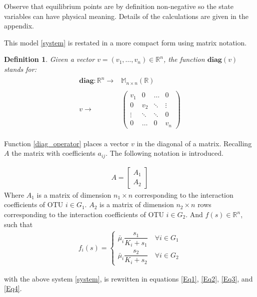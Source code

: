 \documentclass[3p,times]{elsarticle}
\newcommand{\R}{\mathbb{R}}
\newcommand{\diag}{\textbf{diag}}
\newtheorem{defn}{Definition}
\begin{document}
Observe that equilibrium points are by definition non-negative so the state variables can have physical meaning. Details of the calculations are given in the appendix. 

This model \eqref{system} is restated in a more compact form using matrix notation.

\begin{defn} Given a vector $v=(v_1,\dots, v_n)\in \R^n$, the function $\diag(v)$ stands for:
	\begin{align}
	\begin{array}{rc}
	\diag:\R^n \rightarrow & \mathbb{M}_{n\times n}(\R)\\
	& \\
	v \rightarrow & \begin{pmatrix}
	v_1 & 0 & \dots & 0 \\
	0 & v_2 & \ddots & \vdots\\ 
	\vdots & \ddots & \ddots& 0 \\
	0 & \dots &0 & v_n 
	\end{pmatrix}
	\end{array} \label{diag_operator}
	\end{align}
\end{defn}

Function \eqref{diag_operator} places a vector $v$ in the diagonal of a matrix. Recalling $A$ the matrix with coefficients $a_{ij}$. The following notation is introduced.

\begin{align} A = \begin{bmatrix}
A_1\\A_2
\end{bmatrix}\end{align}
 Where $A_1$ is a matrix of dimension $n_1 \times n$ corresponding to the interaction coefficients of OTU $i \in G_1$. $A_2$ is a matrix of dimension $n_2 \times n$ rows corresponding to the interaction coefficients of OTU $i \in G_2$.
And  $f(s) \in \R^n$, such that 
\begin{align}
f_i(s) = \begin{cases}
\bar{\mu}_i \dfrac{s_1}{K_i + s_1} \quad \forall i \in G_1 \\
\bar{\mu}_i \dfrac{s_2}{K_i + s_2} \quad \forall i \in G_2
\end{cases}
\end{align}

with the above system \eqref{system}, is rewritten in equations \eqref{Eq1}, \eqref{Eq2}, \eqref{Eq3}, and \eqref{Eq4}. 
\end{document}
